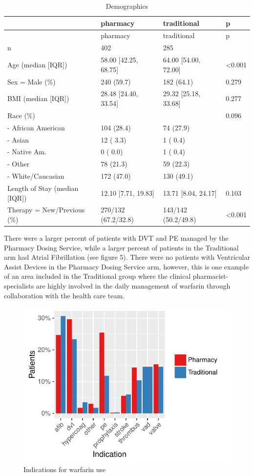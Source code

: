 \documentclass[]{article}
\begin{document}
\begin{longtable}[]{@{}llll@{}}
\caption{Demographics}\tabularnewline
\toprule
& pharmacy & traditional & p\tabularnewline
\midrule
\endfirsthead
\toprule
& pharmacy & traditional & p\tabularnewline
\midrule
\endhead
n & 402 & 285 &\tabularnewline
Age (median {[}IQR{]}) & 58.00 {[}42.25, 68.75{]} & 64.00 {[}54.00,
72.00{]} & \textless{}0.001\tabularnewline
Sex = Male (\%) & 240 (59.7) & 182 (64.1) & 0.279\tabularnewline
BMI (median {[}IQR{]}) & 28.48 {[}24.40, 33.54{]} & 29.32 {[}25.18,
33.68{]} & 0.277\tabularnewline
Race (\%) & & & 0.096\tabularnewline
- African American & 104 (28.4) & 74 (27.9) &\tabularnewline
- Asian & 12 ( 3.3) & 1 ( 0.4) &\tabularnewline
- Native Am. & 0 ( 0.0) & 1 ( 0.4) &\tabularnewline
- Other & 78 (21.3) & 59 (22.3) &\tabularnewline
- White/Caucasian & 172 (47.0) & 130 (49.1) &\tabularnewline
Length of Stay (median {[}IQR{]}) & 12.10 {[}7.71, 19.83{]} & 13.71
{[}8.04, 24.17{]} & 0.103\tabularnewline
Therapy = New/Previous (\%) & 270/132 (67.2/32.8) & 143/142 (50.2/49.8)
& \textless{}0.001\tabularnewline
\bottomrule
\end{longtable}

There were a larger percent of patients with DVT and PE managed by the
Pharmacy Dosing Service, while a larger percent of patients in the
Traditional arm had Atrial Fibrillation (see figure 5). There were no
patients with Ventricular Assist Devices in the Pharmacy Dosing Service
arm, however, this is one example of an area included in the Traditional
group where the clinical pharmacist-specialists are highly involved in
the daily management of warfarin through collaboration with the health
care team.

\begin{figure}[H]
\centering
\includegraphics{warfarin_analysis_2015_files/figure-latex/indications-1.pdf}
\caption{Indications for warfarin use}
\end{figure}
\end{document}
